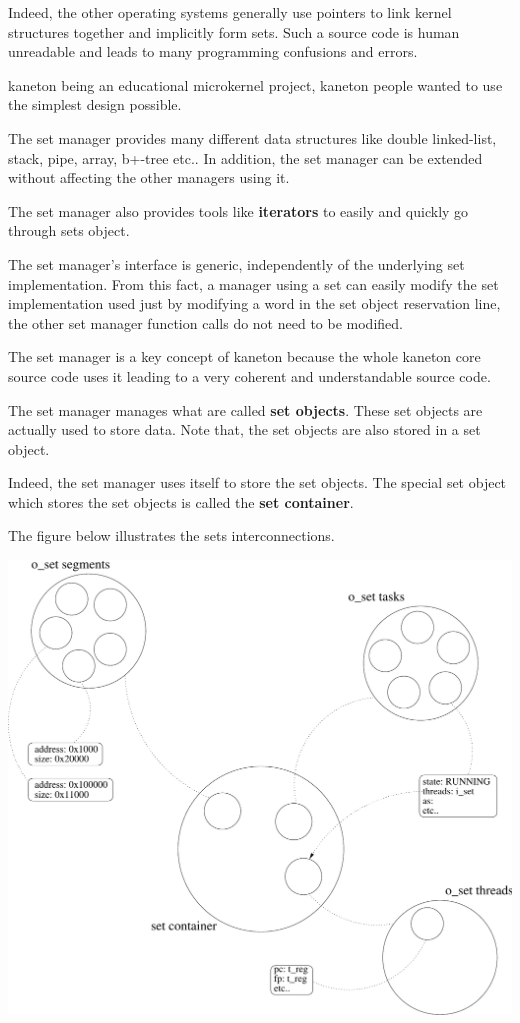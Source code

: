 {\begin{multicols}{2}
Indeed, the other operating systems generally use pointers to link kernel
structures together and implicitly form sets. Such a source code is human
unreadable and leads to many programming confusions and errors.

kaneton being an educational microkernel project, kaneton people wanted
to use the simplest design possible.

The set manager provides many different data structures like double
linked-list, stack, pipe, array, b+-tree etc.. In addition, the set
manager can be extended without affecting the other managers using it.

The set manager also provides tools like \textbf{iterators} to easily and
quickly go through sets object.

The set manager's interface is generic, independently of the underlying set
implementation. From this fact, a manager using a set can easily modify
the set implementation used just by modifying a word in the set
object reservation line, the other set manager function calls do not
need to be modified.

The set manager is a key concept of kaneton because the whole kaneton
core source code uses it leading to a very coherent and understandable
source code.

The set manager manages what are called \textbf{set objects}. These set
objects are actually used to store data. Note that, the set objects are
also stored in a set object.

Indeed, the set manager uses itself to store the set objects. The special
set object which stores the set objects is called the \textbf{set container}.

The figure below illustrates the sets interconnections.

\end{multicols}

\begin{center}
  \includegraphics[scale=0.5]{figures/sets.pdf}
\end{center}

}
